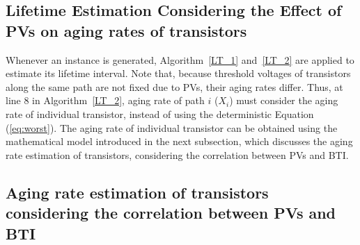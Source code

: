 \subsection{Lifetime Estimation Considering the Effect of PVs on aging rates of transistors}
\label{sec:ins:lt}
Whenever an instance is generated, Algorithm~\ref{LT_1} and~\ref{LT_2} are applied to estimate its lifetime interval. Note that, because threshold voltages of transistors along the same path are not fixed due to PVs, their aging rates differ. Thus, at line 8 in Algorithm~\ref{LT_2}, aging rate of path $i$ ($X_{i}$) must consider the aging rate of individual transistor, instead of using the deterministic Equation (\ref{eq:worst}). The aging rate of individual transistor can be obtained using the mathematical model introduced in the next subsection, which discusses the aging rate estimation of transistors, considering the correlation between PVs and BTI.%

\subsection{Aging rate estimation of transistors considering the correlation between PVs and BTI}
\label{sec:ins:cor}

